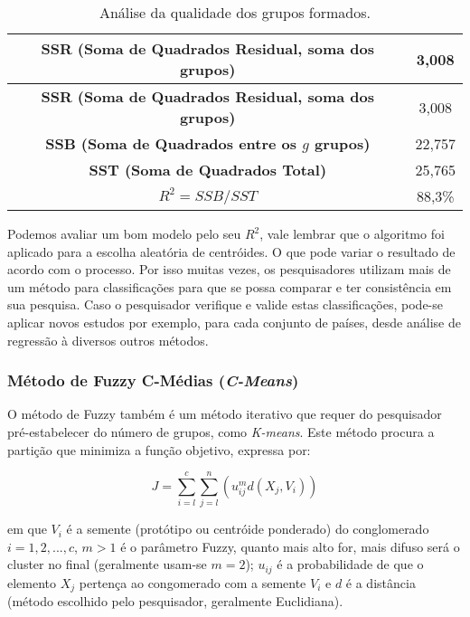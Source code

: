 \documentclass[
  openany]{book}
\begin{document}
\begin{longtable}[]{@{}cc@{}}
\caption{\label{tab:exkmeans3} Análise da qualidade dos grupos formados.}\tabularnewline
\toprule
\textbf{SSR (Soma de Quadrados Residual, soma dos grupos)} & 3,008\tabularnewline
\midrule
\endfirsthead
\toprule
\textbf{SSR (Soma de Quadrados Residual, soma dos grupos)} & 3,008\tabularnewline
\midrule
\endhead
\textbf{SSB (Soma de Quadrados entre os \(g\) grupos)} & 22,757\tabularnewline
\textbf{SST (Soma de Quadrados Total)} & 25,765\tabularnewline
\textbf{\(R^2=SSB/SST\)} & 88,3\%\tabularnewline
\bottomrule
\end{longtable}

Podemos avaliar um bom modelo pelo seu \(R^2\), vale lembrar que o algoritmo foi aplicado para a escolha aleatória de centróides. O que pode variar o resultado de acordo com o processo. Por isso muitas vezes, os pesquisadores utilizam mais de um método para classificações para que se possa comparar e ter consistência em sua pesquisa. Caso o pesquisador verifique e valide estas classificações, pode-se aplicar novos estudos por exemplo, para cada conjunto de países, desde análise de regressão à diversos outros métodos.

\hypertarget{muxe9todo-de-fuzzy-c-muxe9dias-c-means}{%
\subsubsection{\texorpdfstring{Método de Fuzzy C-Médias (\emph{C-Means})}{Método de Fuzzy C-Médias (C-Means)}}\label{muxe9todo-de-fuzzy-c-muxe9dias-c-means}}

O método de Fuzzy \citep{bezdek1981objective} também é um método iterativo que requer do pesquisador pré-estabelecer do número de grupos, como \emph{K-means}. Este método procura a partição que minimiza a função objetivo, expressa por:

\begin{equation}
J=\displaystyle \sum^c_{i=l} \sum^n_{j=l} (u_{ij}^m d(X_j,V_i))
 \label{eq:cmeansobjetivo}
\end{equation}

em que \(V_i\) é a semente (protótipo ou centróide ponderado) do conglomerado \(i=1,2,...,c\), \(m>1\) é o parâmetro Fuzzy, quanto mais alto for, mais difuso será o cluster no final (geralmente usam-se \(m=2\)); \(u_{ij}\) é a probabilidade de que o elemento \(X_j\) pertença ao congomerado com a semente \(V_i\) e \(d\) é a distância (método escolhido pelo pesquisador, geralmente Euclidiana).
\end{document}
